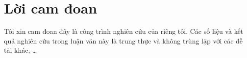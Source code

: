\chapter*{Lời cam đoan}
\label{reassurances}

Tôi xin cam đoan đây là công trình nghiên cứu của riêng tôi. Các số liệu và kết quả nghiên cứu trong luận văn này là trung thực và không trùng lặp với các đề tài khác, \ldots
